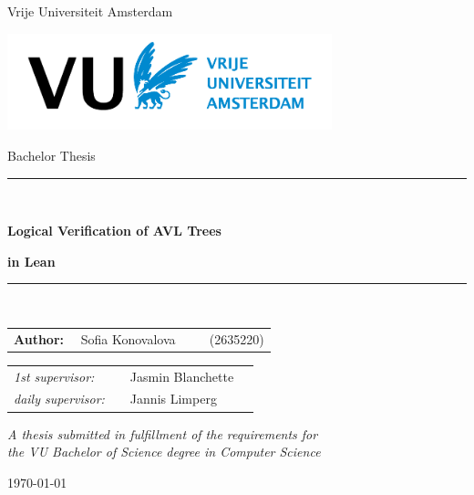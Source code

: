 \documentclass[11pt, oneside, a4paper]{book}
\theoremstyle{definition}
\begin{document}
\thispagestyle{empty}

\begin{center}

Vrije Universiteit Amsterdam

\vspace{1cm}

\includegraphics[height=28mm]{logo.png}

\vspace{1cm}

{\Large Bachelor Thesis}

\vspace*{1.5cm}

\rule{.9\linewidth}{.6pt}\\[0.4cm]
{\huge \bfseries Logical Verification of AVL Trees\par}
{\huge \bfseries in Lean\par}\vspace{0.4cm}
\rule{.9\linewidth}{.6pt}\\[1.5cm]

\vspace*{2mm}

{\Large
\begin{tabular}{l}
{\bf Author:} ~~Sofia Konovalova ~~~~ (2635220)
\end{tabular}
}

\vspace*{1.5cm}

\begin{tabular}{ll}
{\it 1st supervisor:}   & ~~Jasmin Blanchette \\
{\it daily supervisor:} & ~~Jannis Limperg ~~~~ \\
\end{tabular}

\vspace*{2cm}

\textit{A thesis submitted in fulfillment of the requirements for\\ the VU Bachelor of Science degree in Computer Science }

\vspace*{1cm}

\today\\[4cm] %

\end{center}
\end{document}

